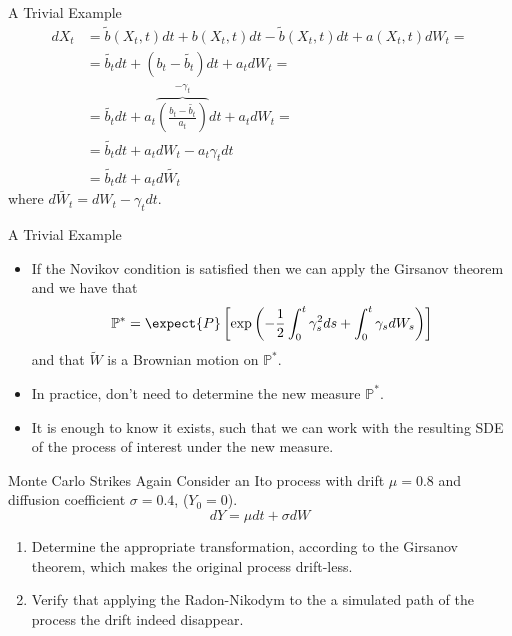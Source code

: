 \documentclass{beamer}
\begin{document}
\begin{frame}{A Trivial Example}
  \begin{equation*}
    \begin{aligned}
      dX_t &= \tilde{b}(X_t,t) dt+b(X_t,t) dt -\tilde{b}(X_t,t) dt + a(X_t,t) dW_t = \\
      &=\tilde{b_t} dt + (b_t -\tilde{b_t})dt + a_t dW_t =\\
      &=\tilde{b_t}dt+ a_t\overbrace{\left(\frac{b_t-\tilde{b_t}}{a_t}\right)}^{-\gamma_t}dt + a_t dW_t = \\
      &= \tilde{b_t}dt+a_t dW_t - a_t\gamma_t dt\\
      &=\tilde{b_t}dt+a_t d\tilde{W_t}
    \end{aligned}
  \end{equation*}
  where $d\tilde{W_t}=dW_t-\gamma_t dt$.
\end{frame}

\begin{frame}{A Trivial Example}
  \begin{itemize}
  \item<1-> If the Novikov condition is satisfied then we can apply the Girsanov theorem and we have that
    \begin{equation}
      \mathbb{P}^* = \expect{P}\left[\exp\left(-\frac{1}{2}\int_0^t \gamma_s^2 ds + \int_0^t \gamma_s dW_s \right)\right]
    \end{equation}
    and that $\tilde{W}$ is a Brownian motion on $\mathbb{P}^*$.
  \item<2-> In practice, don't need to determine the new measure $\mathbb{P}^*$.
  \item<2-> It is enough to know it exists, such that we can work with the resulting SDE of the process of interest under the new measure.	
  \end{itemize}
\end{frame}

\begin{frame}{Monte Carlo Strikes Again}
Consider an Ito process with drift $\mu=0.8$ and diffusion coefficient $\sigma=0.4$, ($Y_0=0$).
\begin{equation*}
dY = \mu dt + \sigma dW
\end{equation*}
\begin{enumerate}
\item Determine the appropriate transformation, according to the Girsanov theorem, which makes the original process drift-less.
\item Verify that applying the Radon-Nikodym to the a simulated path of the process the drift indeed disappear.
\end{enumerate}
\end{frame}
\end{document}
